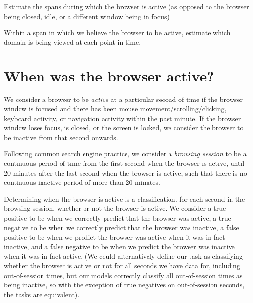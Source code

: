 \documentclass{sigchi}
\begin{document}
\begin{compactitem}
	\item Estimate the spans during which the browser is active (as opposed to the browser being closed, idle, or a different window being in focus)
	\item Within a span in which we believe the browser to be active, estimate which domain is being viewed at each point in time.
\end{compactitem}

\section{When was the browser active?}

We consider a browser to be \textit{active} at a particular second of time if the browser window is focused and there has been mouse movement/scrolling/clicking, keyboard activity, or navigation activity within the past minute. If the browser window loses focus, is closed, or the screen is locked, we consider the browser to be inactive from that second onwards.

Following common search engine practice, we consider a \textit{browsing session} to be a continuous period of time from the first second when the browser is active, until 20 minutes after the last second when the browser is active, such that there is no continuous inactive period of more than 20 minutes.

Determining when the browser is active is a classification, for each second in the browsing session, whether or not the browser is active. We consider a true positive to be when we correctly predict that the browser was active, a true negative to be when we correctly predict that the browser was inactive, a false positive to be when we predict the browser was active when it was in fact inactive, and a false negative to be when we predict the browser was inactive when it was in fact active. (We could alternatively define our task as classifying whether the browser is active or not for all seconds we have data for, including out-of-session times, but our models correctly classify all out-of-session times as being inactive, so with the exception of true negatives on out-of-session seconds, the tasks are equivalent).

\end{document}
